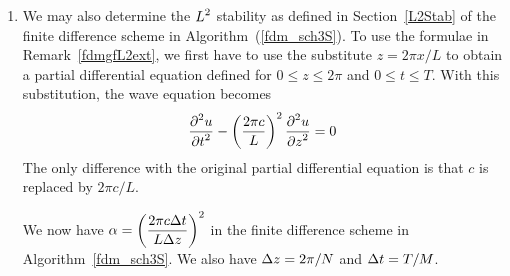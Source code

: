\begin{rmkList} \label{dfmLastRmks}
\begin{enumerate}
\item We may also determine the $\displaystyle L^2$ stability as defined in
Section~\ref{L2Stab} of the finite difference scheme in
Algorithm~(\ref{fdm_sch3S}).  To use the formulae in
Remark~\ref{fdmgfL2ext}, we first have to use the substitute
$z = 2\pi x /L$ to obtain a partial
differential equation defined for $0 \leq z \leq 2\pi$ and
$0 \leq t \leq T$.  With this substitution, the wave equation becomes
\[
  \frac{\displaystyle \partial^{2}{u}} {\displaystyle \partial{t}^{2}} - \left(\frac{2\pi c}{L}\right)^2 \frac{\displaystyle \partial^{2}{u}} {\displaystyle \partial{z}^{2}} = 0
\]
The only difference with the original partial differential equation is
that $c$ is replaced by $2\pi c/L$.  \label{dfmLastRmksItem1}

We now have
$\displaystyle \alpha = \left(\frac{2\pi c \Delta{t}}{L \Delta{z}}\right)^2$
in the finite difference scheme in Algorithm~\ref{fdm_sch3S}.  We also have
$\Delta{z} = 2\pi/N$ and $\Delta{t} = T/M$.


\end{enumerate}
\end{rmkList}
